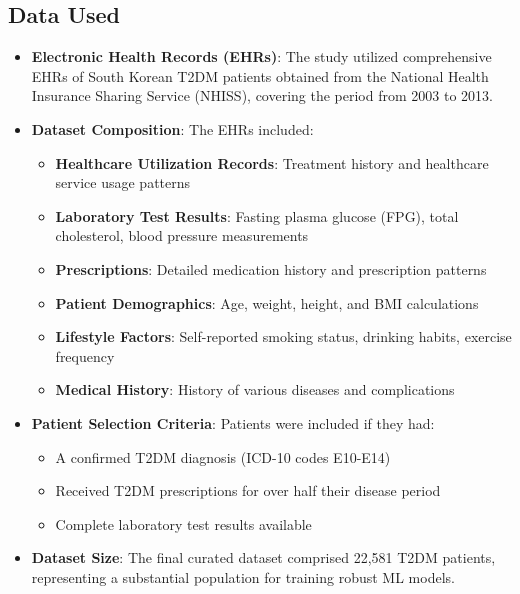 \subsection*{Data Used}
\begin{itemize}
    \item \textbf{Electronic Health Records (EHRs)}: The study utilized comprehensive EHRs of South Korean T2DM patients obtained from the National Health Insurance Sharing Service (NHISS), covering the period from 2003 to 2013.
    \item \textbf{Dataset Composition}: The EHRs included:
    \begin{itemize}
        \item \textbf{Healthcare Utilization Records}: Treatment history and healthcare service usage patterns
        \item \textbf{Laboratory Test Results}: Fasting plasma glucose (FPG), total cholesterol, blood pressure measurements
        \item \textbf{Prescriptions}: Detailed medication history and prescription patterns
        \item \textbf{Patient Demographics}: Age, weight, height, and BMI calculations
        \item \textbf{Lifestyle Factors}: Self-reported smoking status, drinking habits, exercise frequency
        \item \textbf{Medical History}: History of various diseases and complications
    \end{itemize}
    \item \textbf{Patient Selection Criteria}: Patients were included if they had:
    \begin{itemize}
        \item A confirmed T2DM diagnosis (ICD-10 codes E10-E14)
        \item Received T2DM prescriptions for over half their disease period
        \item Complete laboratory test results available
    \end{itemize}
    \item \textbf{Dataset Size}: The final curated dataset comprised 22,581 T2DM patients, representing a substantial population for training robust ML models.
\end{itemize}

